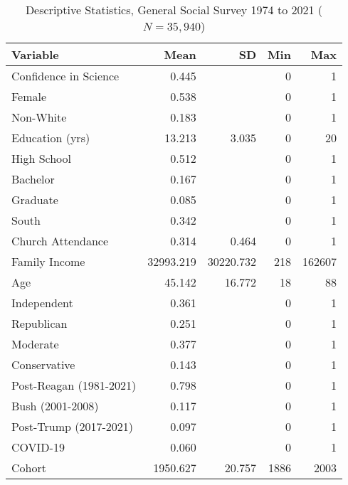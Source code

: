 \begin{table}[ht]
\centering
\caption{Descriptive Statistics, General Social Survey 1974 to 2021 ($N=35,940$)} 
\begin{tabularx}{\textwidth}{Xrrrr}
  \toprule
Variable & Mean & SD & Min & Max \\ 
  \midrule
Confidence in Science & 0.445 &  & 0 & 1 \\ 
  Female & 0.538 &  & 0 & 1 \\ 
  Non-White & 0.183 &  & 0 & 1 \\ 
  Education (yrs) & 13.213 & 3.035 & 0 & 20 \\ 
  High School & 0.512 &  & 0 & 1 \\ 
  Bachelor & 0.167 &  & 0 & 1 \\ 
  Graduate & 0.085 &  & 0 & 1 \\ 
  South & 0.342 &  & 0 & 1 \\ 
  Church Attendance & 0.314 & 0.464 & 0 & 1 \\ 
  Family Income & 32993.219 & 30220.732 & 218 & 162607 \\ 
  Age & 45.142 & 16.772 & 18 & 88 \\ 
  Independent & 0.361 &  & 0 & 1 \\ 
  Republican & 0.251 &  & 0 & 1 \\ 
  Moderate & 0.377 &  & 0 & 1 \\ 
  Conservative & 0.143 &  & 0 & 1 \\ 
  Post-Reagan (1981-2021) & 0.798 &  & 0 & 1 \\ 
  Bush (2001-2008) & 0.117 &  & 0 & 1 \\ 
  Post-Trump (2017-2021) & 0.097 &  & 0 & 1 \\ 
  COVID-19 & 0.060 &  & 0 & 1 \\ 
  Cohort & 1950.627 & 20.757 & 1886 & 2003 \\ 
   \bottomrule
\end{tabularx}
\end{table}
